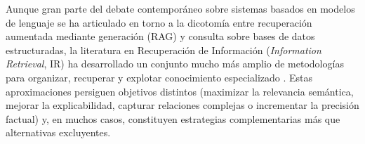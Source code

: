     
    

Aunque gran parte del debate contemporáneo sobre sistemas basados en modelos de lenguaje se ha articulado en torno a la dicotomía entre recuperación aumentada mediante generación (RAG) y consulta sobre bases de datos estructuradas, la literatura en Recuperación de Información (\textit{Information Retrieval}, IR) ha desarrollado un conjunto mucho más amplio de metodologías para organizar, recuperar y explotar conocimiento especializado \citep{manning2008introduction}. Estas aproximaciones persiguen objetivos distintos (maximizar la relevancia semántica, mejorar la explicabilidad, capturar relaciones complejas o incrementar la precisión factual) y, en muchos casos, constituyen estrategias complementarias más que alternativas excluyentes.

